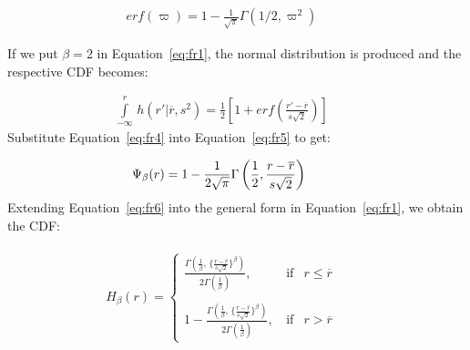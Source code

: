 \begin{equation}
  \begin{aligned}
   erf(\varpi) = 1 -  \frac{1}{\sqrt{\pi}}\Gamma\left( 1/2, \varpi^2\right)
  \end{aligned}
  \phantom{\hspace{1cm}}
  \label{eq:fr4}
 \end{equation} 
 
 \noindent If we put $\beta = 2$ in Equation~\ref{eq:fr1}, the normal distribution is produced and the respective CDF becomes:
 
\begin{equation}
  \begin{aligned}
   \int\limits_{-\infty}^{r}\, h(r'| \overline{r}, s^2) = \frac{1}{2}\left[ 1 + erf\left(\frac{r' - \overline{r}}{s \sqrt{2}}\right)\right]
  \end{aligned}
  \phantom{\hspace{1cm}}
  \label{eq:fr5}
 \end{equation}
Substitute Equation~\ref{eq:fr4} into Equation~\ref{eq:fr5} to get:


\begin{equation}
  \begin{aligned}
    \Psi_{\rm \beta}(r) = 1 - \frac{1}{2\sqrt{\pi}}\Gamma\left( \frac{1}{2}, \frac{r - \overline{r}}{s \sqrt{2}}\right)
  \end{aligned}
  \phantom{\hspace{1cm}}
  \label{eq:fr6}
 \end{equation}
 Extending Equation~\ref{eq:fr6} into the general form in Equation~\ref{eq:fr1}, we obtain the CDF:
 
\begin{eqnarray}
 \begin{aligned}
 H_{\beta}(r) = \left\{\begin{array}{rcl}
                   \frac{\Gamma\left( \frac{1}{\beta},\, \{\frac{r - \overline{r}}{s \sqrt{2}}\}^\beta \right)}{2\Gamma(\frac{1}{\beta})}, & \, \mbox{if} & r \leq \overline{r} \\
                   \\
                  1 -  \frac{\Gamma \left( \frac{1}{\beta}, \, \{\frac{r - \overline{r}}{s \sqrt{2}}\}^\beta \right)}{2\Gamma(\frac{1}{\beta})}, & \, \mbox{if} & r > \overline{r}
                   \end{array}\right.
                   \end{aligned}
  \phantom{\hspace{1cm}}
  \label{eq:fr7}
\end{eqnarray}
%

